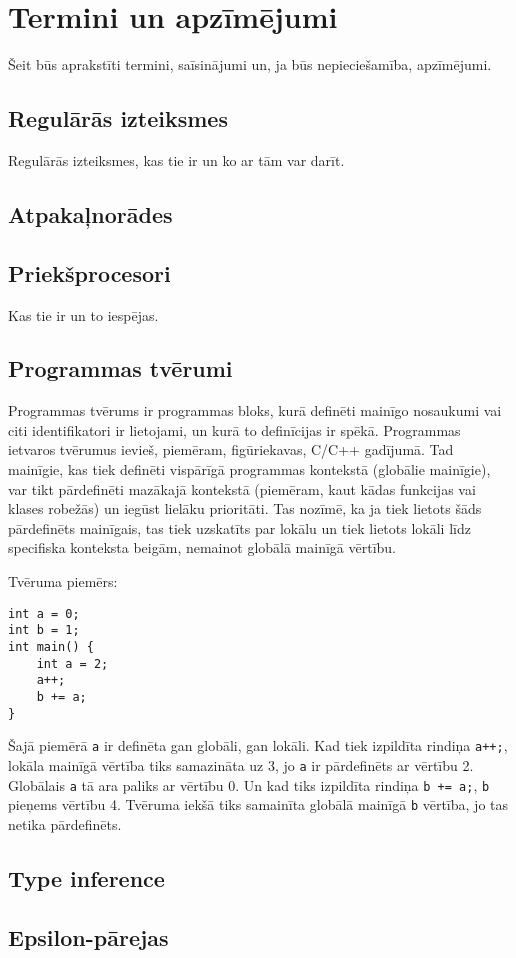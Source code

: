 \section*{Termini un apzīmējumi}
Šeit būs aprakstīti termini, saīsinājumi un, ja būs nepieciešamība, apzīmējumi.

\subsection*{Regulārās izteiksmes}
Regulārās izteiksmes, kas tie ir un ko ar tām var darīt.

\subsection*{Atpakaļnorādes}

\subsection*{Priekšprocesori}
Kas tie ir un to iespējas.

\subsection*{Programmas tvērumi}

Programmas tvērums ir programmas bloks, kurā definēti mainīgo nosaukumi vai citi identifikatori ir lietojami, un kurā to definīcijas ir spēkā. Programmas ietvaros tvērumus ievieš, piemēram, figūriekavas, C/C++ gadījumā. Tad mainīgie, kas tiek definēti vispārīgā programmas kontekstā (globālie mainīgie), var tikt pārdefinēti mazākajā kontekstā (piemēram, kaut kādas funkcijas vai klases robežās) un iegūst lielāku prioritāti. Tas nozīmē, ka ja tiek lietots šāds pārdefinēts mainīgais, tas tiek uzskatīts par lokālu un tiek lietots lokāli līdz specifiska konteksta beigām, nemainot globālā mainīgā vērtību.

Tvēruma piemērs:
\begin{verbatim}
int a = 0;
int b = 1;
int main() {
    int a = 2;
    a++;
    b += a;
}
\end{verbatim}
Šajā piemērā \verb|a| ir definēta gan globāli, gan lokāli. Kad tiek izpildīta rindiņa \verb|a++;|, lokāla mainīgā vērtība tiks samazināta uz 3, jo \verb|a| ir pārdefinēts ar vērtību 2. Globālais \verb|a| tā ara paliks ar vērtību 0. Un kad tiks izpildīta rindiņa \verb|b += a;|, \verb|b| pieņems vērtību 4. Tvēruma iekšā tiks samainīta globālā mainīgā \verb|b| vērtība, jo tas netika pārdefinēts.

\subsection*{Type inference}

\subsection*{Epsilon-pārejas}

